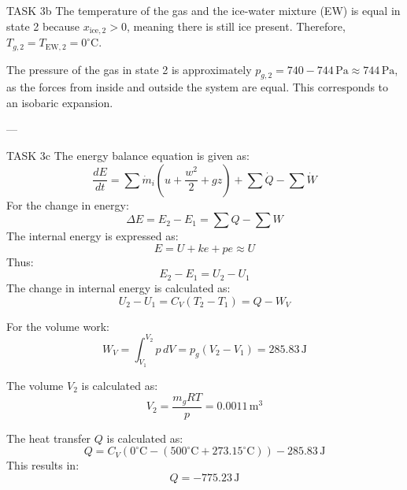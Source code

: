 TASK 3b  
The temperature of the gas and the ice-water mixture (EW) is equal in state 2 because \( x_{\text{ice},2} > 0 \), meaning there is still ice present. Therefore, \( T_{g,2} = T_{\text{EW},2} = 0^\circ\text{C} \).

The pressure of the gas in state 2 is approximately \( p_{g,2} = 740 - 744 \, \text{Pa} \approx 744 \, \text{Pa} \), as the forces from inside and outside the system are equal. This corresponds to an isobaric expansion.

---

TASK 3c  
The energy balance equation is given as:  
\[
\frac{dE}{dt} = \sum \dot{m}_i (u + \frac{w^2}{2} + gz) + \sum \dot{Q} - \sum \dot{W}
\]  
For the change in energy:  
\[
\Delta E = E_2 - E_1 = \sum Q - \sum W
\]  
The internal energy is expressed as:  
\[
E = U + ke + pe \approx U
\]  
Thus:  
\[
E_2 - E_1 = U_2 - U_1
\]  
The change in internal energy is calculated as:  
\[
U_2 - U_1 = C_V (T_2 - T_1) = Q - W_V
\]  

For the volume work:  
\[
W_V = \int_{V_1}^{V_2} p \, dV = p_g (V_2 - V_1) = 285.83 \, \text{J}
\]  

The volume \( V_2 \) is calculated as:  
\[
V_2 = \frac{m_g R T}{p} = 0.0011 \, \text{m}^3
\]  

The heat transfer \( Q \) is calculated as:  
\[
Q = C_V (0^\circ\text{C} - (500^\circ\text{C} + 273.15^\circ\text{C})) - 285.83 \, \text{J}
\]  
This results in:  
\[
Q = -775.23 \, \text{J}
\]  

